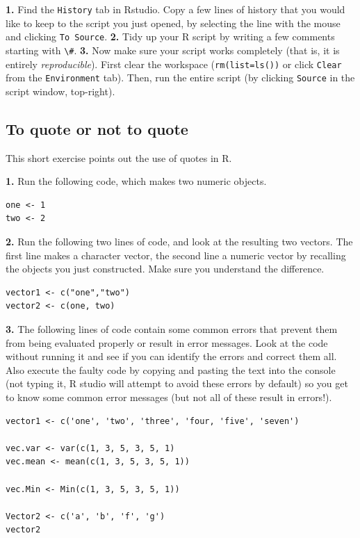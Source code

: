 \documentclass[]{book}
\begin{document}
\textbf{1.} Find the \texttt{History} tab in Rstudio. Copy a few lines of history that you would like to keep to the script you just opened, by selecting the line with the mouse and clicking \texttt{To\ Source}.
\textbf{2.} Tidy up your R script by writing a few comments starting with \texttt{\textbackslash{}\#}.
\textbf{3.} Now make sure your script works completely (that is, it is entirely \emph{reproducible}). First clear the workspace (\texttt{rm(list=ls())} or click \texttt{Clear} from the \texttt{Environment} tab). Then, run the entire script (by clicking \texttt{Source} in the script window, top-right).

\hypertarget{exquote}{%
\subsection{To quote or not to quote}\label{exquote}}

This short exercise points out the use of quotes in R.

\textbf{1.} Run the following code, which makes two numeric objects.

\begin{verbatim}
one <- 1
two <- 2
\end{verbatim}

\textbf{2.} Run the following two lines of code, and look at the resulting two vectors. The first line makes a character vector, the second line a numeric vector by recalling the objects you just constructed. Make sure you understand the difference.

\begin{verbatim}
vector1 <- c("one","two")
vector2 <- c(one, two)
\end{verbatim}

\textbf{3.} The following lines of code contain some common errors that prevent them from being evaluated properly or result in error messages. Look at the code without running it and see if you can identify the errors and correct them all. Also execute the faulty code by copying and pasting the text into the console (not typing it, R studio will attempt to avoid these errors by default) so you get to know some common error messages (but not all of these result in errors!).

\begin{verbatim}
vector1 <- c('one', 'two', 'three', 'four, 'five', 'seven')

vec.var <- var(c(1, 3, 5, 3, 5, 1)
vec.mean <- mean(c(1, 3, 5, 3, 5, 1))

vec.Min <- Min(c(1, 3, 5, 3, 5, 1))

Vector2 <- c('a', 'b', 'f', 'g')
vector2
\end{verbatim}
\end{document}
